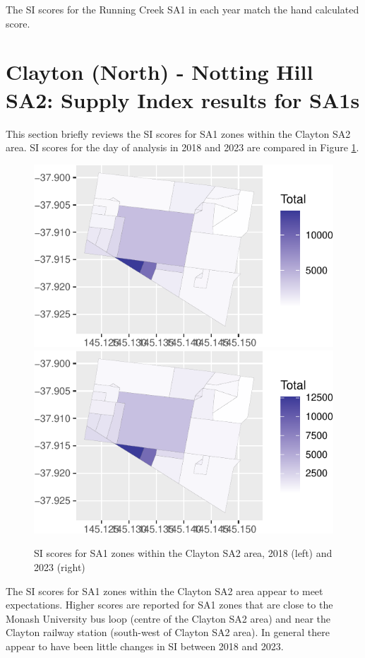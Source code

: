\documentclass[]{tufte-book}
\begin{document}
The SI scores for the Running Creek SA1 in each year match the hand
calculated score.

\hypertarget{clayton-north---notting-hill-sa2-supply-index-results-for-sa1s}{%
\section{Clayton (North) - Notting Hill SA2: Supply Index results for
SA1s}\label{clayton-north---notting-hill-sa2-supply-index-results-for-sa1s}}

This section briefly reviews the SI scores for SA1 zones within the
Clayton SA2 area. SI scores for the day of analysis in 2018 and 2023 are
compared in Figure \ref{fig:Clayton_SI_2021}.

\begin{figure}
\includegraphics[width=0.5\linewidth]{Reynolds_Currie_2024_transit_supply_index_GTFS_files/figure-latex/Clayton_SI_2021-1} \includegraphics[width=0.5\linewidth]{Reynolds_Currie_2024_transit_supply_index_GTFS_files/figure-latex/Clayton_SI_2021-2} \caption[SI scores for SA1 zones within the Clayton SA2 area, 2018 (left) and 2023 (right)]{SI scores for SA1 zones within the Clayton SA2 area, 2018 (left) and 2023 (right)}\label{fig:Clayton_SI_2021}
\end{figure}

The SI scores for SA1 zones within the Clayton SA2 area appear to meet
expectations. Higher scores are reported for SA1 zones that are close to
the Monash University bus loop (centre of the Clayton SA2 area) and near
the Clayton railway station (south-west of Clayton SA2 area). In general
there appear to have been little changes in SI between 2018 and 2023.
\end{document}
